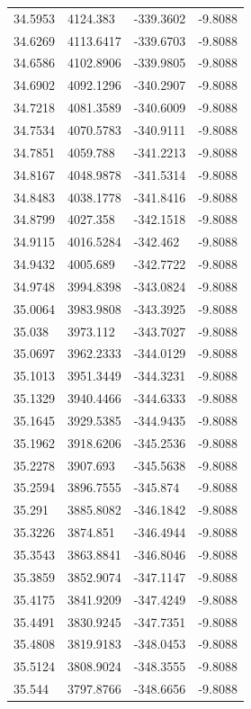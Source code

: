 \begin{table}[H]
\begin{tabular}{llll}
34.5953 & 4124.383 & -339.3602 & -9.8088 \\
34.6269 & 4113.6417 & -339.6703 & -9.8088 \\
34.6586 & 4102.8906 & -339.9805 & -9.8088 \\
34.6902 & 4092.1296 & -340.2907 & -9.8088 \\
34.7218 & 4081.3589 & -340.6009 & -9.8088 \\
34.7534 & 4070.5783 & -340.9111 & -9.8088 \\
34.7851 & 4059.788 & -341.2213 & -9.8088 \\
34.8167 & 4048.9878 & -341.5314 & -9.8088 \\
34.8483 & 4038.1778 & -341.8416 & -9.8088 \\
34.8799 & 4027.358 & -342.1518 & -9.8088 \\
34.9115 & 4016.5284 & -342.462 & -9.8088 \\
34.9432 & 4005.689 & -342.7722 & -9.8088 \\
34.9748 & 3994.8398 & -343.0824 & -9.8088 \\
35.0064 & 3983.9808 & -343.3925 & -9.8088 \\
35.038 & 3973.112 & -343.7027 & -9.8088 \\
35.0697 & 3962.2333 & -344.0129 & -9.8088 \\
35.1013 & 3951.3449 & -344.3231 & -9.8088 \\
35.1329 & 3940.4466 & -344.6333 & -9.8088 \\
35.1645 & 3929.5385 & -344.9435 & -9.8088 \\
35.1962 & 3918.6206 & -345.2536 & -9.8088 \\
35.2278 & 3907.693 & -345.5638 & -9.8088 \\
35.2594 & 3896.7555 & -345.874 & -9.8088 \\
35.291 & 3885.8082 & -346.1842 & -9.8088 \\
35.3226 & 3874.851 & -346.4944 & -9.8088 \\
35.3543 & 3863.8841 & -346.8046 & -9.8088 \\
35.3859 & 3852.9074 & -347.1147 & -9.8088 \\
35.4175 & 3841.9209 & -347.4249 & -9.8088 \\
35.4491 & 3830.9245 & -347.7351 & -9.8088 \\
35.4808 & 3819.9183 & -348.0453 & -9.8088 \\
35.5124 & 3808.9024 & -348.3555 & -9.8088 \\
35.544 & 3797.8766 & -348.6656 & -9.8088 \\

\end{tabular}
\end{table}
